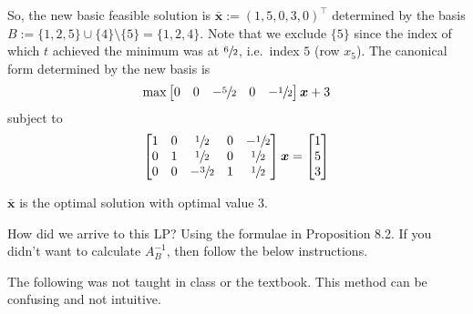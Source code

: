 \begin{exbox}
    \begin{example}
        So, the new basic feasible solution is $\bm{\bar{x}}:=(1,5,0,3,0)^\top$
        determined by the basis $B:=\{1,2,5\}\cup\{4\}\setminus \{5\}=\{1,2,4\}$. Note that
        we exclude $\{5\}$ since the index of which $t$ achieved the minimum was at
        $\sfrac{6}{2}$, i.e.\ index $5$ (row $x_5$). The canonical form determined by the new
        basis is
        \[\max \begin{bmatrix}
                0 & 0 & -\sfrac{5}{2} & 0 & -\sfrac{1}{2}
            \end{bmatrix}\bm{x}+3\]
        subject to
        \[
            \begin{bmatrix}
                1 & 0 & \sfrac{1}{2}  & 0 & -\sfrac{1}{2} \\
                0 & 1 & \sfrac{1}{2}  & 0 & \sfrac{1}{2}  \\
                0 & 0 & -\sfrac{3}{2} & 1 & \sfrac{1}{2}
            \end{bmatrix}\bm{x}
            =
            \begin{bmatrix}
                1 \\
                5 \\
                3
            \end{bmatrix}
        \]
    \end{example}
\end{exbox}

\begin{remark}
    $\bm{\bar{x}}$ is the optimal solution with optimal value $3$.
\end{remark}
\begin{remark}
    How did we arrive to this LP\@? Using the formulae in Proposition 8.2. If you didn't want to
    calculate $A_B^{-1}$, then follow the below instructions.
\end{remark}

\begin{remark}
    The following was not taught in class or the textbook.
    This method can be confusing and not intuitive.
\end{remark}

